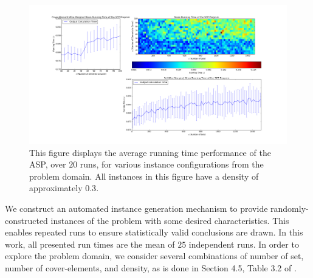 \documentclass[12pt]{article}
\begin{document}
\begin{figure}[ht!]\label{fig:runtime_analysis_density0p3}
	
	
	
	\centering
	\centerline{\includegraphics[width = 6.7in]{running_time_original_density0p3.png}}
	\hfill
	
	\caption{This figure displays the average running time performance of the ASP, over $20$ runs, for various instance configurations from the problem domain. All instances in this figure have a density of approximately $0.3$.}
	
	
\end{figure}


We construct an automated instance generation mechanism to provide randomly-constructed instances of the problem with some desired characteristics. This enables repeated runs to ensure statistically valid conclusions are drawn. In this work, all presented run times are the mean of $25$ independent runs. In order to explore the problem domain, we consider several combinations of number of set, number of cover-elements, and density, as is done in Section 4.5, Table 3.2 of \cite{graph_algorithms_cristofides}.
\end{document}
